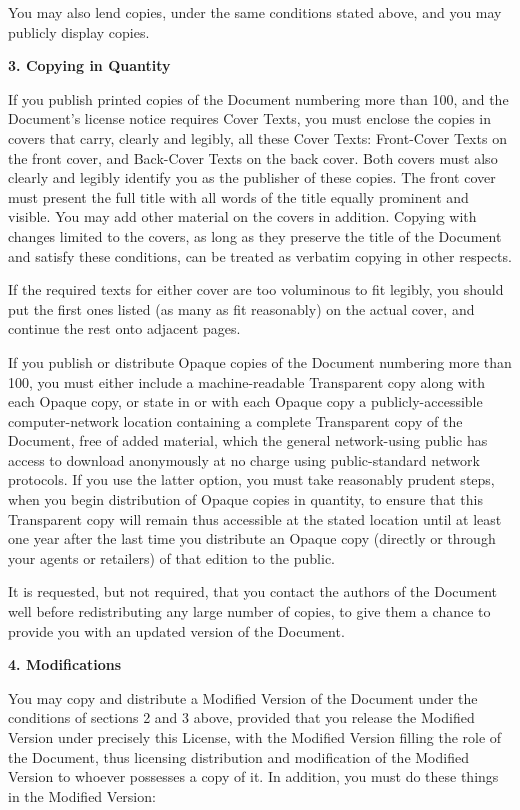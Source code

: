 \documentclass{doc}
\begin{document}
You may also lend copies, under the same conditions stated above, and
you may publicly display copies.


\noindent\textbf{3. Copying in Quantity}

If you publish printed copies of the Document numbering more than 100,
and the Document's license notice requires Cover Texts, you must enclose
the copies in covers that carry, clearly and legibly, all these Cover
Texts: Front-Cover Texts on the front cover, and Back-Cover Texts on
the back cover.  Both covers must also clearly and legibly identify
you as the publisher of these copies.  The front cover must present
the full title with all words of the title equally prominent and
visible.  You may add other material on the covers in addition.
Copying with changes limited to the covers, as long as they preserve
the title of the Document and satisfy these conditions, can be treated
as verbatim copying in other respects.

If the required texts for either cover are too voluminous to fit
legibly, you should put the first ones listed (as many as fit
reasonably) on the actual cover, and continue the rest onto adjacent
pages.

If you publish or distribute Opaque copies of the Document numbering
more than 100, you must either include a machine-readable Transparent
copy along with each Opaque copy, or state in or with each Opaque copy
a publicly-accessible computer-network location containing a complete
Transparent copy of the Document, free of added material, which the
general network-using public has access to download anonymously at no
charge using public-standard network protocols.  If you use the latter
option, you must take reasonably prudent steps, when you begin
distribution of Opaque copies in quantity, to ensure that this
Transparent copy will remain thus accessible at the stated location
until at least one year after the last time you distribute an Opaque
copy (directly or through your agents or retailers) of that edition to
the public.

It is requested, but not required, that you contact the authors of the
Document well before redistributing any large number of copies, to give
them a chance to provide you with an updated version of the Document.


\noindent\textbf{4. Modifications}

You may copy and distribute a Modified Version of the Document under
the conditions of sections 2 and 3 above, provided that you release
the Modified Version under precisely this License, with the Modified
Version filling the role of the Document, thus licensing distribution
and modification of the Modified Version to whoever possesses a copy
of it.  In addition, you must do these things in the Modified Version:
\end{document}
